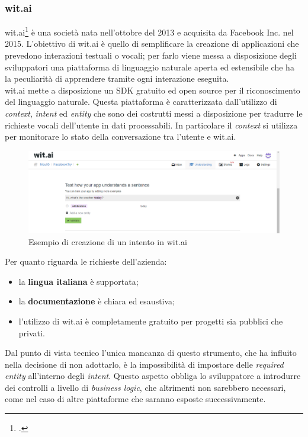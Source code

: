 \subsubsection{wit.ai}
wit.ai\footcite{witai} è una società nata nell'ottobre del 2013 e acquisita da Facebook Inc. nel 2015.
L'obiettivo di wit.ai è quello di semplificare la creazione di applicazioni che prevedono interazioni testuali o vocali; per farlo viene messa a disposizione degli sviluppatori una piattaforma di linguaggio naturale aperta ed estensibile che ha la peculiarità di apprendere tramite ogni interazione eseguita.\\
wit.ai mette a disposizione un \gls{SDK} gratuito ed \gls{open source} per il riconoscimento del linguaggio
naturale. Questa piattaforma è caratterizzata dall'utilizzo di \emph{context}, \emph{intent} ed \emph{entity} che sono
dei costrutti messi a disposizione per tradurre le richieste vocali dell'utente in dati processabili. In particolare il \emph{context} si utilizza per monitorare lo stato della conversazione tra l'utente e wit.ai.

\begin{figure}[h]
	\centering
	\includegraphics[scale=0.4]{../Immagini/witai_example.png}
	\caption{Esempio di creazione di un intento in wit.ai}
\end{figure}

Per quanto riguarda le richieste dell'azienda:
\begin{itemize}
	\item la \textbf{lingua italiana} è supportata;
	\item la \textbf{documentazione} è chiara ed esaustiva;
	\item l'utilizzo di wit.ai è completamente gratuito per progetti sia pubblici che privati.
\end{itemize}

Dal punto di vista tecnico l'unica mancanza di questo strumento, che ha influito nella decisione di non adottarlo, è la impossibilità di impostare delle \emph{required entity} all'interno degli \emph{intent}. Questo aspetto obbliga lo sviluppatore a introdurre dei controlli a livello di \emph{business logic}, che altrimenti non sarebbero necessari, come nel caso di altre piattaforme che saranno esposte successivamente.

